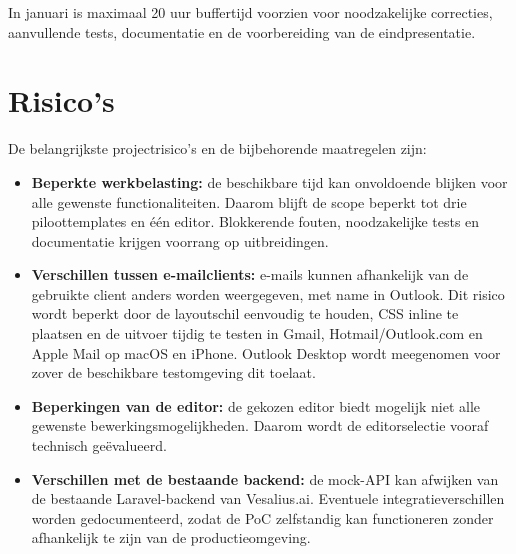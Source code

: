 In januari is maximaal 20 uur buffertijd voorzien voor noodzakelijke
correcties, aanvullende tests, documentatie en de voorbereiding van de
eindpresentatie.

\section{Risico's}
De belangrijkste projectrisico's en de bijbehorende maatregelen zijn:

\begin{itemize}
    \item \textbf{Beperkte werkbelasting:} de beschikbare tijd kan
    onvoldoende blijken voor alle gewenste functionaliteiten.
    Daarom blijft de scope beperkt tot drie piloottemplates en één
    editor. Blokkerende fouten, noodzakelijke tests en documentatie
    krijgen voorrang op uitbreidingen.

    \item \textbf{Verschillen tussen e-mailclients:} e-mails kunnen
    afhankelijk van de gebruikte client anders worden weergegeven,
    met name in Outlook. Dit risico wordt beperkt door de layoutschil
    eenvoudig te houden, CSS inline te plaatsen en de uitvoer tijdig
    te testen in Gmail, Hotmail/Outlook.com en Apple Mail op macOS
    en iPhone. Outlook Desktop wordt meegenomen voor zover de
    beschikbare testomgeving dit toelaat.

    \item \textbf{Beperkingen van de editor:} de gekozen editor biedt
    mogelijk niet alle gewenste bewerkingsmogelijkheden. Daarom wordt
    de editorselectie vooraf technisch geëvalueerd.

    \item \textbf{Verschillen met de bestaande backend:} de mock-API
    kan afwijken van de bestaande Laravel-backend van Vesalius.ai.
    Eventuele integratieverschillen worden gedocumenteerd, zodat de
    PoC zelfstandig kan functioneren zonder afhankelijk te zijn van
    de productieomgeving.
\end{itemize}
